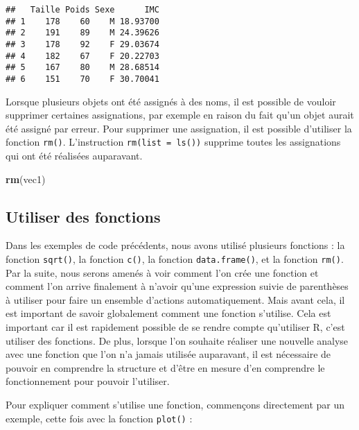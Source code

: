 \documentclass[
  french,
]{book}
\newenvironment{Shaded}{\begin{snugshade}}{\end{snugshade}}
\newcommand{\DataTypeTok}[1]{\textcolor[rgb]{0.13,0.29,0.53}{#1}}
\newcommand{\KeywordTok}[1]{\textcolor[rgb]{0.13,0.29,0.53}{\textbf{#1}}}
\newcommand{\NormalTok}[1]{#1}
\newcommand{\OperatorTok}[1]{\textcolor[rgb]{0.81,0.36,0.00}{\textbf{#1}}}
\begin{document}
\begin{verbatim}
##   Taille Poids Sexe      IMC
## 1    178    60    M 18.93700
## 2    191    89    M 24.39626
## 3    178    92    F 29.03674
## 4    182    67    F 20.22703
## 5    167    80    M 28.68514
## 6    151    70    F 30.70041
\end{verbatim}

Lorsque plusieurs objets ont été assignés à des noms, il est possible de vouloir supprimer certaines assignations, par exemple en raison du fait qu'un objet aurait été assigné par erreur. Pour supprimer une assignation, il est possible d'utiliser la fonction \texttt{rm()}. L'instruction \texttt{rm(list\ =\ ls())} supprime toutes les assignations qui ont été réalisées auparavant.

\begin{Shaded}
\begin{Highlighting}[]
\KeywordTok{rm}\NormalTok{(vec1)}
\end{Highlighting}
\end{Shaded}

\hypertarget{utiliser-des-fonctions}{%
\subsection{Utiliser des fonctions}\label{utiliser-des-fonctions}}

Dans les exemples de code précédents, nous avons utilisé plusieurs fonctions : la fonction \texttt{sqrt()}, la fonction \texttt{c()}, la fonction \texttt{data.frame()}, et la fonction \texttt{rm()}. Par la suite, nous serons amenés à voir comment l'on crée une fonction et comment l'on arrive finalement à n'avoir qu'une expression suivie de parenthèses à utiliser pour faire un ensemble d'actions automatiquement. Mais avant cela, il est important de savoir globalement comment une fonction s'utilise. Cela est important car il est rapidement possible de se rendre compte qu'utiliser R, c'est utiliser des fonctions. De plus, lorsque l'on souhaite réaliser une nouvelle analyse avec une fonction que l'on n'a jamais utilisée auparavant, il est nécessaire de pouvoir en comprendre la structure et d'être en mesure d'en comprendre le fonctionnement pour pouvoir l'utiliser.

Pour expliquer comment s'utilise une fonction, commençons directement par un exemple, cette fois avec la fonction \texttt{plot()} :

\begin{Shaded}
\end{Shaded}
\end{document}
